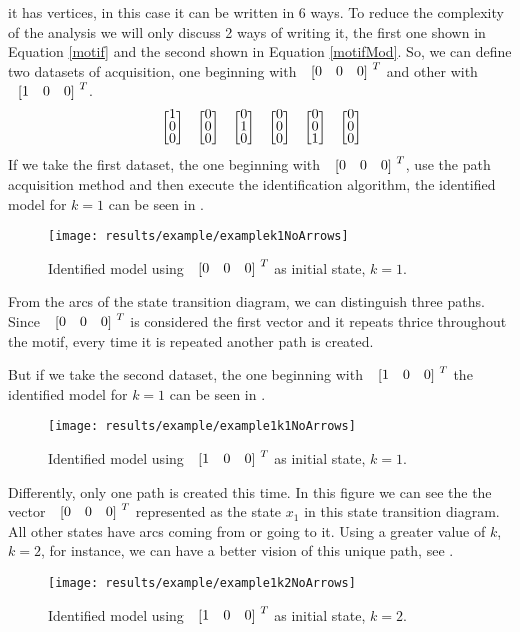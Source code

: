 it has vertices, in this case it can be written in 6 ways. To reduce the
complexity of the analysis we will only discuss 2 ways of writing it, the first
one shown in Equation
\ref{motif} and the second shown in Equation \ref{motifMod}. So, we can define two datasets of acquisition,
one beginning with $\colvec{0&0&0}^T$ and other with $\colvec{1&0&0}^T$.
\begin{align}
  \label{motifMod}
\colvec{1\\0\\0}\colvec{0\\0\\0}\colvec{0\\1\\0}\colvec{0\\0\\0}\colvec{0\\0\\1}\colvec{0\\0\\0}
\end{align}
If we take the first dataset, the one beginning with $\colvec{0&0&0}^T$, use the
path acquisition method and then
execute the identification algorithm, the identified model for $k=1$ can be
seen in . 
\begin{figure}[H]
  \centering
 \texttt{[image: results/example/examplek1NoArrows]}
  \caption{Identified model using $\colvec{0&0&0}^T$ as initial state, $k=1$.}
    \label{fig:exampleCol000k1}
\end{figure}
From the arcs of the state transition diagram, we can distinguish three paths. Since
$\colvec{0&0&0}^T$ is considered the first vector and it repeats thrice
throughout the motif, every time it is repeated another path is created.

But if we take the second dataset, the one beginning with $\colvec{1&0&0}^T$ the identified model for $k=1$ can be
seen in . 
\begin{figure}[H]
  \centering
  \texttt{[image: results/example/example1k1NoArrows]}
  \caption{Identified model using $\colvec{1&0&0}^T$ as initial state, $k=1$.}
    \label{fig:exampleCol100k1}
\end{figure}
Differently, only one path is created this time. In this figure we can see the
the vector $\colvec{0&0&0}^T$ represented as the state
$x_1$ in this state transition diagram. All other states have arcs coming
from or going to it. Using a greater value of $k$, $k=2$, for instance, we can have a
better vision of this unique path, see .
\begin{figure}[H]
  \centering
  \texttt{[image: results/example/example1k2NoArrows]}
  \caption{Identified model using $\colvec{1&0&0}^T$ as initial state, $k=2$.}
    \label{fig:exampleCol100k2}
  \end{figure}


